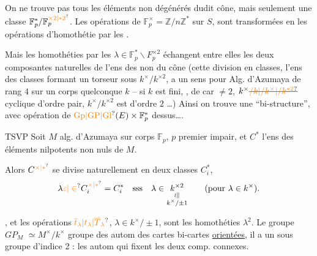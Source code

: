 On ne trouve pas tous les éléments non dégénérés
dudit cône, mais  seulement  une
classe  $\mathbb F_p^*/\mathbb F_p^{\unsure{\times2|*2}}$. Les opérations  de
$\mathbb F_p^\times=\mathbb Z/n\mathbb Z^*$ sur $S$, sont transformées en
les opérations d'homothétie par les .

Mais les homothéties par les $\lambda\in\mathbb F_p^*\smallsetminus F_p^{\times2}$
échangent entre elles les deux
composantes naturelles de l'ens des 
 non  du cône (cette division
en classes,  l'ens des
classes formant un torseur sous $k^\times/k^{\times2}$,
a un sens pour  Alg. d'Azumaya
de rang $4$ sur un corps quelconque $k$ --
si $k$ est fini, , de car $\ne2$, $k^\times\deleted{\unsure{/k|/k^\times|/k^{*2}}}$
cyclique d'ordre pair, $k^\times/k^{\times2}$ est d'ordre $2$
\ldots ) Ainsi on trouve une ``bi-structure'',
avec opération de $\unsure{\mathrm{Gp}|\mathrm{GP}|\mathrm{Gl}}(E)\times\mathbb F_p^*$ dessus\ldots.

\hfill TSVP
Soit $M$ alg. d'Azumaya sur corps $\mathbb F_p$, $p$ premier impair, et $C^*$ l'ens des éléments nilpotents non nuls de $M$.

Alors  $C^{\unsure{\times|*}}$ se divise naturellement en deux classes $C_i^*$, 
\[
\lambda\unsure{\varepsilon|\in} C_i^{\unsure{\times|*}}=C_i^*\quad\mathrm{sss}\quad\lambda\in\underset{\substack{\wr\Vert\\ k^\times/\pm1}}{k^{\times2}}\qquad(\text{pour }\lambda\in k^\times).
\]

 , et les opérations $\unsure{\overline t_\lambda|t_\lambda|\overline T_\lambda}$, $\lambda\in k^\times/\pm1$, sont les homothéties $\lambda^2$. Le groupe $G\!P_M$ $\simeq M^\times/k^\times$   groupe des autom des cartes bi-cartes \uline{orientées}, il a un sous groupe d'indice 2 : les autom qui fixent les deux comp. connexes. 

